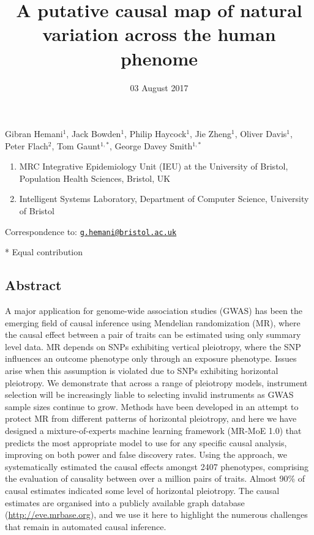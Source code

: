 \documentclass[]{article}
\title{A putative causal map of natural variation across the human phenome}
\author{}
\date{03 August 2017}
\providecommand{\tightlist}{%
  \setlength{\itemsep}{0pt}\setlength{\parskip}{0pt}}
\begin{document}
\maketitle

Gibran Hemani\(^1\), Jack Bowden\(^1\), Philip Haycock\(^1\), Jie
Zheng\(^1\), Oliver Davis\(^1\), Peter Flach\(^2\), Tom Gaunt\(^{1,*}\),
George Davey Smith\(^{1,*}\)

\begin{enumerate}
\def\labelenumi{\arabic{enumi}.}
\tightlist
\item
  MRC Integrative Epidemiology Unit (IEU) at the University of Bristol,
  Population Health Sciences, Bristol, UK
\item
  Intelligent Systems Laboratory, Department of Computer Science,
  University of Bristol
\end{enumerate}

Correspondence to:
\href{mailto:g.hemani@bristol.ac.uk}{\nolinkurl{g.hemani@bristol.ac.uk}}

* Equal contribution

\subsection{Abstract}\label{abstract}

A major application for genome-wide association studies (GWAS) has been
the emerging field of causal inference using Mendelian randomization
(MR), where the causal effect between a pair of traits can be estimated
using only summary level data. MR depends on SNPs exhibiting vertical
pleiotropy, where the SNP influences an outcome phenotype only through
an exposure phenotype. Issues arise when this assumption is violated due
to SNPs exhibiting horizontal pleiotropy. We demonstrate that across a
range of pleiotropy models, instrument selection will be increasingly
liable to selecting invalid instruments as GWAS sample sizes continue to
grow. Methods have been developed in an attempt to protect MR from
different patterns of horizontal pleiotropy, and here we have designed a
mixture-of-experts machine learning framework (MR-MoE 1.0) that predicts
the most appropriate model to use for any specific causal analysis,
improving on both power and false discovery rates. Using the approach,
we systematically estimated the causal effects amongst 2407 phenotypes,
comprising the evaluation of causality between over a million pairs of
traits. Almost 90\% of causal estimates indicated some level of
horizontal pleiotropy. The causal estimates are organised into a
publicly available graph database (\url{http://eve.mrbase.org}), and we
use it here to highlight the numerous challenges that remain in
automated causal inference.
\end{document}
